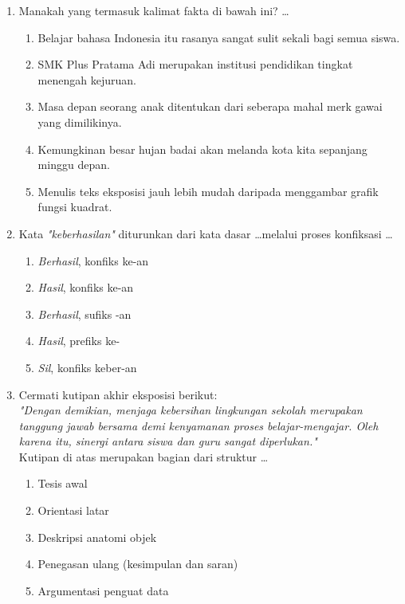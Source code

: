 \documentclass[12pt,a4paper]{article}
\begin{document}
\begin{enumerate}[leftmargin=*]
\item Manakah yang termasuk kalimat fakta di bawah ini? \dots
    \begin{enumerate}[label=\alph*.]
        \item Belajar bahasa Indonesia itu rasanya sangat sulit sekali bagi semua siswa.
        \item SMK Plus Pratama Adi merupakan institusi pendidikan tingkat menengah kejuruan.
        \item Masa depan seorang anak ditentukan dari seberapa mahal merk gawai yang dimilikinya.
        \item Kemungkinan besar hujan badai akan melanda kota kita sepanjang minggu depan.
        \item Menulis teks eksposisi jauh lebih mudah daripada menggambar grafik fungsi kuadrat.
    \end{enumerate}

\item Kata \textit{"keberhasilan"} diturunkan dari kata dasar \dots melalui proses konfiksasi \dots
    \begin{enumerate}[label=\alph*.]
        \item \textit{Berhasil}, konfiks ke-an
        \item \textit{Hasil}, konfiks ke-an
        \item \textit{Berhasil}, sufiks -an
        \item \textit{Hasil}, prefiks ke-
        \item \textit{Sil}, konfiks keber-an
    \end{enumerate}

\item Cermati kutipan akhir eksposisi berikut:\\
\textit{"Dengan demikian, menjaga kebersihan lingkungan sekolah merupakan tanggung jawab bersama demi kenyamanan proses belajar-mengajar. Oleh karena itu, sinergi antara siswa dan guru sangat diperlukan."}\\
Kutipan di atas merupakan bagian dari struktur \dots
    \begin{enumerate}[label=\alph*.]
        \item Tesis awal
        \item Orientasi latar
        \item Deskripsi anatomi objek
        \item Penegasan ulang (kesimpulan dan saran)
        \item Argumentasi penguat data
    \end{enumerate}

\end{enumerate}
\end{document}
